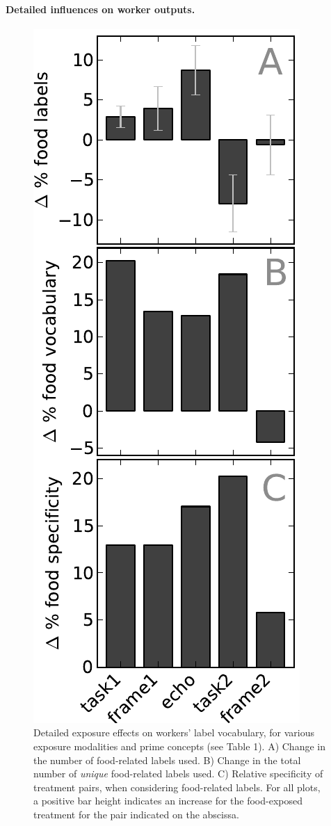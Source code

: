 \documentclass[12pt]{article}
\begin{document}
\paragraph{Detailed influences on worker outputs.} 
\begin{figure}
	\centering
	\includegraphics[scale=1]{figs/vocab_specificity.pdf}
	\caption{
		Detailed exposure effects on workers' label vocabulary, for various
		exposure modalities and prime concepts (see Table 1).  A) Change in 
		the number of food-related labels used. B) Change in the total number 
		of \textit{unique} food-related labels used. C) Relative specificity
		of treatment pairs, when considering food-related labels.  For all
		plots, a positive bar height indicates an increase for the 
		food-exposed treatment for the pair indicated on the abscissa.
	}
	\label{fig:specificity}
\end{figure}
\end{document}
